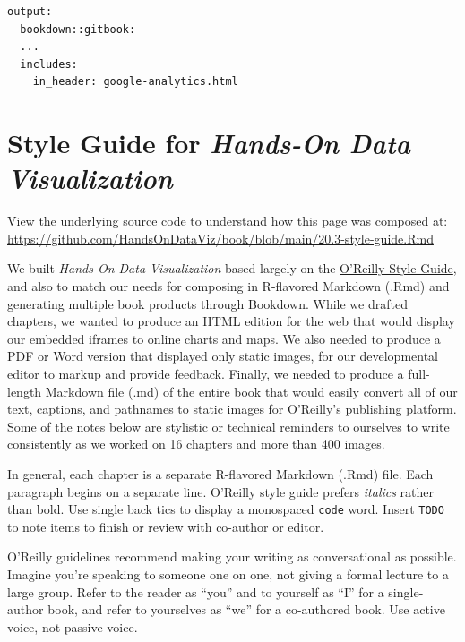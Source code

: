\documentclass[
  english,
]{book}
\begin{document}
\begin{verbatim}
output:
  bookdown::gitbook:
  ...
  includes:
    in_header: google-analytics.html
\end{verbatim}

\hypertarget{style-guide}{%
\section*{\texorpdfstring{Style Guide for \emph{Hands-On Data Visualization}}{Style Guide for Hands-On Data Visualization}}\label{style-guide}}

View the underlying source code to understand how this page was composed at: \url{https://github.com/HandsOnDataViz/book/blob/main/20.3-style-guide.Rmd}

We built \emph{Hands-On Data Visualization} based largely on the \href{https://oreillymedia.github.io/production-resources/styleguide/}{O'Reilly Style Guide}, and also to match our needs for composing in R-flavored Markdown (.Rmd) and generating multiple book products through Bookdown. While we drafted chapters, we wanted to produce an HTML edition for the web that would display our embedded iframes to online charts and maps. We also needed to produce a PDF or Word version that displayed only static images, for our developmental editor to markup and provide feedback. Finally, we needed to produce a full-length Markdown file (.md) of the entire book that would easily convert all of our text, captions, and pathnames to static images for O'Reilly's publishing platform. Some of the notes below are stylistic or technical reminders to ourselves to write consistently as we worked on 16 chapters and more than 400 images.

In general, each chapter is a separate R-flavored Markdown (.Rmd) file. Each paragraph begins on a separate line. O'Reilly style guide prefers \emph{italics} rather than bold. Use single back tics to display a monospaced \texttt{code} word. Insert \texttt{TODO} to note items to finish or review with co-author or editor.

O'Reilly guidelines recommend making your writing as conversational as possible. Imagine you're speaking to someone one on one, not giving a formal lecture to a large group. Refer to the reader as ``you'' and to yourself as ``I'' for a single-author book, and refer to yourselves as ``we'' for a co-authored book. Use active voice, not passive voice.
\end{document}
